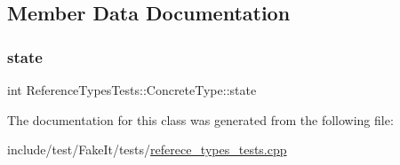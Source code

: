 \subsection{Member Data Documentation}
\mbox{\label{classReferenceTypesTests_1_1ConcreteType_a6c8b60deef594b3428cf1f0efaeacf7e}} 
\subsubsection{\texorpdfstring{state}{state}}
{\footnotesize\ttfamily int Reference\+Types\+Tests\+::\+Concrete\+Type\+::state}



The documentation for this class was generated from the following file\+:\begin{DoxyCompactItemize}
\item 
include/test/\+Fake\+It/tests/\mbox{\hyperlink{referece__types__tests_8cpp}{referece\+\_\+types\+\_\+tests.\+cpp}}\end{DoxyCompactItemize}
